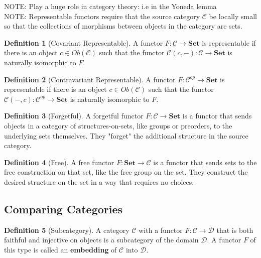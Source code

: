 \documentclass{article}
\theoremstyle{definition}
\newtheorem{definition}{Definition}
\begin{document}
NOTE: Play a huge role in category theory: i.e in the Yoneda lemma\\
NOTE: Representable functors require that the source category $\mathcal{C}$ be locally small so that the collections of morphisms between objects in the category are sets.
\begin{definition}[Covariant Representable]
    A functor $F:\mathcal{C}\rightarrow\mathbf{Set}$ is representable if there is an object $c\in Ob(\mathcal{C})$ such that the functor $\mathcal{C}(c,-):\mathcal{C}\rightarrow \mathbf{Set}$ is naturally isomorphic to $F$.
\end{definition}


\begin{definition}[Contravariant Representable]
    A functor $F:\mathcal{C}^{op}\rightarrow\mathbf{Set}$ is representable if there is an object $c\in Ob(\mathcal{C})$ such that the functor $\mathcal{C}(-,c):\mathcal{C}^{op}\rightarrow \mathbf{Set}$ is naturally isomorphic to $F$.
\end{definition}


\begin{definition}[Forgetful]
    A forgetful functor $F:\mathcal{C}\rightarrow\mathbf{Set}$ is a functor that sends objects in a category of structures-on-sets, like groups or preorders, to the underlying sets themselves.
    They "forget" the additional structure in the source category.
\end{definition}

\begin{definition}[Free]
    A free functor $F:\mathbf{Set}\rightarrow\mathcal{C}$ is a functor that sends sets to the free construction on that set, like the free group on the set.
    They construct the desired structure on the set in a way that requires no choices.
\end{definition}



\subsection*{Comparing Categories}

\begin{definition}[Subcategory]
    A category $\mathcal{C}$ with a functor $F:\mathcal{C}\rightarrow\mathcal{D}$ that is both faithful and injective on objects is a subcategory of the domain $\mathcal{D}$.
    A functor $F$ of this type is called an \textbf{embedding} of $\mathcal{C}$ into $\mathcal{D}$.
\end{definition}
\end{document}
